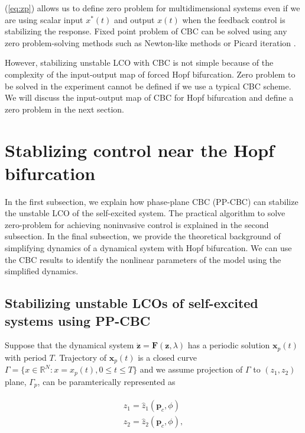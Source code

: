 \documentclass[openacc]{rsproca_new}%
\theoremstyle{own}
\def\vec#1{\ensuremath{\mathbf{#1}}}
\newcommand{\Eref}[1]{(\ref{#1})}
\begin{document}
\noindent \Eref{eq:zp} allows us to define zero problem for multidimensional systems even if we are using scalar input $x^*(t)$ and output $x(t)$ when the feedback control is stabilizing the response. Fixed point problem of CBC can be solved using any zero problem-solving methods such as Newton-like methods \cite{schilder2015experimental} or Picard iteration \cite{barton2013systematic}.

However, stabilizing unstable LCO with CBC is not simple because of the complexity of the input-output map of forced Hopf bifurcation. Zero problem to be solved in the experiment cannot be defined if we use a typical CBC scheme. We will discuss the input-output map of CBC for Hopf bifurcation and define a zero problem in the next section.

\section{Stablizing control near the Hopf bifurcation}\label{SNH}

In the first subsection, we explain how phase-plane CBC (PP-CBC) can stabilize the unstable LCO of the self-excited system. The practical algorithm to solve zero-problem for achieving noninvasive control is explained in the second subsection. In the final subsection, we provide the theoretical background of simplifying dynamics of a dynamical system with Hopf bifurcation. We can use the CBC results to identify the nonlinear parameters of the model using the simplified dynamics.

\subsection{Stabilizing unstable LCOs of self-excited systems using PP-CBC} \label{CBC-t}
Suppose that the dynamical system $\dot{\vec{z}}= \vec F(\vec{z},\lambda)$ has a periodic solution $\vec x_{p}(t)$ with period $T$. Trajectory of $\vec x_{p}(t)$ is a closed curve  $\Gamma=\{ x \in \mathbb{R}^N: x=x_p(t), 0 \leq t \leq T\}$ and we assume projection of $\Gamma$ to $(z_1,z_2)$ plane, $\Gamma_p$, can be paramterically represented as

\begin{align}\label{PP_curve}
	\begin{split}
z_1=\hat z_1(\vec p_c,\phi)\\
z_2=\hat z_2(\vec p_c,\phi),\\
\end{split}
\end{align}
\end{document}

